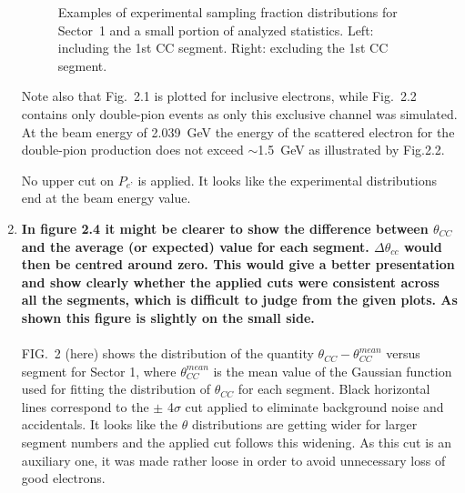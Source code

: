 \documentclass[,superscriptaddress,showpacs,amssymb,amsmath,amsfonts,linenumbers,article]{revtex4-1}
\begin{document}
\begin{enumerate}[label=\textbf{\arabic*}.]
\begin{figure}[htp]
\begin{center}
\caption{\small  Examples of experimental sampling fraction distributions for Sector~1 and a small portion of analyzed statistics. Left: including the 1st CC segment. Right: excluding the 1st CC segment.} \label{fig:cc_plane_def}
\end{center}
\end{figure}


Note also that Fig.~2.1 is plotted for inclusive electrons, while Fig.~2.2 contains only double-pion events as only this exclusive channel was simulated. At the beam energy of 2.039~GeV the energy of the scattered electron for the double-pion production does not exceed $\sim$1.5~GeV as illustrated by Fig.2.2.

No upper cut on $P_{e’}$ is applied. It looks like the experimental distributions end at the beam energy value. 


\item {\bf In figure 2.4 it might be clearer to show the difference between $\theta_{CC}$ and the average (or expected) value for each segment. $\Delta \theta_{cc}$ would then be centred around zero. This would give a better presentation and show clearly whether the applied cuts were consistent across all the segments, which is difficult to judge from the given plots. As shown this figure is slightly on the small side.}\\ \\
FIG.~2 (here) shows the distribution of the quantity $\theta_{CC} - \theta_{CC}^{mean}$ versus segment for Sector 1, where $\theta_{CC}^{mean}$ is the mean value of the Gaussian function used for fitting the distribution of $\theta_{CC}$ for each segment. Black horizontal lines correspond to the $\pm$ 4$\sigma$ cut applied to eliminate background noise and accidentals. It looks like the $\theta$ distributions are getting wider for larger segment numbers and the applied cut follows this widening. As this cut is an auxiliary one, it was made rather loose in order to avoid unnecessary loss of good electrons.


\end{enumerate}
\end{document}
